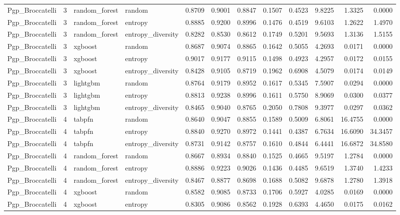 \begin{tabular}{lrllrrrrrrrr}
Pgp_Broccatelli & 3 & random_forest & random & 0.8709 & 0.9001 & 0.8847 & 0.1507 & 0.4523 & 9.8225 & 1.3325 & 0.0000 \\
Pgp_Broccatelli & 3 & random_forest & entropy & 0.8885 & 0.9200 & 0.8996 & 0.1476 & 0.4519 & 9.6103 & 1.2622 & 1.4970 \\
Pgp_Broccatelli & 3 & random_forest & entropy_diversity & 0.8282 & 0.8530 & 0.8612 & 0.1749 & 0.5201 & 9.5693 & 1.3136 & 1.5155 \\
Pgp_Broccatelli & 3 & xgboost & random & 0.8687 & 0.9074 & 0.8865 & 0.1642 & 0.5055 & 4.2693 & 0.0171 & 0.0000 \\
Pgp_Broccatelli & 3 & xgboost & entropy & 0.9017 & 0.9177 & 0.9115 & 0.1498 & 0.4923 & 4.2957 & 0.0172 & 0.0155 \\
Pgp_Broccatelli & 3 & xgboost & entropy_diversity & 0.8428 & 0.9105 & 0.8719 & 0.1962 & 0.6908 & 4.5079 & 0.0174 & 0.0149 \\
Pgp_Broccatelli & 3 & lightgbm & random & 0.8764 & 0.9179 & 0.8952 & 0.1617 & 0.5345 & 7.5907 & 0.0294 & 0.0000 \\
Pgp_Broccatelli & 3 & lightgbm & entropy & 0.8813 & 0.9238 & 0.8996 & 0.1611 & 0.5750 & 8.9069 & 0.0300 & 0.0377 \\
Pgp_Broccatelli & 3 & lightgbm & entropy_diversity & 0.8465 & 0.9040 & 0.8765 & 0.2050 & 0.7808 & 9.3977 & 0.0297 & 0.0362 \\
Pgp_Broccatelli & 4 & tabpfn & random & 0.8640 & 0.9047 & 0.8855 & 0.1589 & 0.5009 & 6.8061 & 16.4755 & 0.0000 \\
Pgp_Broccatelli & 4 & tabpfn & entropy & 0.8840 & 0.9270 & 0.8972 & 0.1441 & 0.4387 & 6.7634 & 16.6090 & 34.3457 \\
Pgp_Broccatelli & 4 & tabpfn & entropy_diversity & 0.8731 & 0.9142 & 0.8757 & 0.1610 & 0.4844 & 6.4441 & 16.6872 & 34.8580 \\
Pgp_Broccatelli & 4 & random_forest & random & 0.8667 & 0.8934 & 0.8840 & 0.1525 & 0.4665 & 9.5197 & 1.2784 & 0.0000 \\
Pgp_Broccatelli & 4 & random_forest & entropy & 0.8886 & 0.9223 & 0.9026 & 0.1436 & 0.4485 & 9.6519 & 1.3740 & 1.4233 \\
Pgp_Broccatelli & 4 & random_forest & entropy_diversity & 0.8467 & 0.8877 & 0.8698 & 0.1688 & 0.5082 & 9.6878 & 1.2780 & 1.3918 \\
Pgp_Broccatelli & 4 & xgboost & random & 0.8582 & 0.9085 & 0.8733 & 0.1706 & 0.5927 & 4.0285 & 0.0169 & 0.0000 \\
Pgp_Broccatelli & 4 & xgboost & entropy & 0.8305 & 0.9086 & 0.8562 & 0.1928 & 0.6393 & 4.4650 & 0.0175 & 0.0162 \\

\end{tabular}

